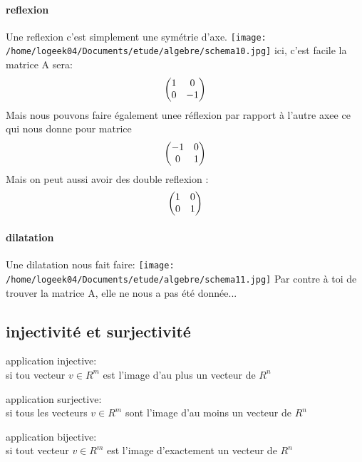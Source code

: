 \documentclass[a4paper,10pt]{article}
\begin{document}
\paragraph{reflexion}
Une reflexion c'est simplement une symétrie d'axe.
\texttt{[image: /home/logeek04/Documents/etude/algebre/schema10.jpg]}
\newline
ici, c'est facile la matrice A sera:
\[
\begin{pmatrix}
1&0\cr
0&-1\cr
\end{pmatrix}
\]
\newline
Mais nous pouvons faire également unee réflexion par rapport à l'autre axee ce qui nous donne pour matrice 
\[
\begin{pmatrix}
-1&0\cr
0&1\cr
\end{pmatrix}
\]
\newline
Mais on peut aussi avoir des double reflexion :
\[
\begin{pmatrix}
1&0\cr
0&1\cr
\end{pmatrix}
\]
\paragraph{dilatation}
Une dilatation nous fait faire:
\texttt{[image: /home/logeek04/Documents/etude/algebre/schema11.jpg]}
Par contre à toi de trouver la matrice A, elle ne nous a pas été donnée...
\subsection{injectivité et surjectivité}
\begin{description}
 \item application injective:\\{si tou vecteur $v\in R^m$ est l'image d'au plus un vecteur de $R^n$}
 \item application surjective:\\{si tous les vecteurs $v\in R^m$ sont l'image d'au moins un vecteur de $R^n$}
 \item application bijective:\\{si tout vecteur $v\in R^m$ est l'image d'exactement un vecteur de $R^n$}
\end{description}
\end{document}
